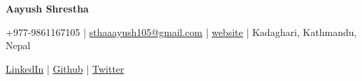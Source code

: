 \documentclass[a4paper,11pt]{article}
\newcommand{\socialicon}[1]{\raisebox{-0.05em}{\resizebox{!}{1em}{#1}}}
\newcommand{\ieeeicon}[1]{\raisebox{-0.3em}{\resizebox{!}{1.3em}{#1}}}
\newcommand{\headerfontiii}{\fontfamily{ppl}\selectfont} %
\begin{document}
\headerfontiii

\begin{center}
    {\Huge\textbf{Aayush Shrestha}}
\end{center}
\vspace{-8mm}

\begin{center}
    \small{
    +977-9861167105 | \href{mailto:sthaaayush105@gmail.com}{sthaaayush105@gmail.com} | 
    \href{https://aayush105.github.io/}{ {website}}
    | 
    \small{Kadaghari, Kathmandu, Nepal}
    }
\end{center}
\vspace{-8mm}



\begin{center}
    \small{
    \socialicon{\faLinkedin} \href{https://www.linkedin.com/in/aayushrestha/}{LinkedIn} | 
    \socialicon{\faGithub} \href{https://github.com/aayush105}{Github} | 
    \socialicon{\faTwitter} \href{https://twitter.com/aayushrestha5}{Twitter}
    }
\end{center}
\vspace{-6mm}

\vspace{-2mm}

\end{document}
